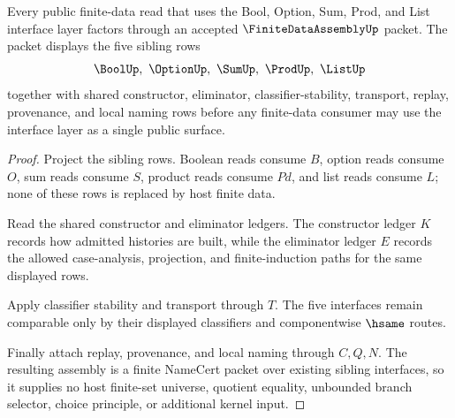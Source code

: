 \begin{theorem}
\label{thm:finite-data-assembly-seed-obligation}
Every public finite-data read that uses the Bool, Option, Sum, Prod, and List interface layer factors through an accepted $\FiniteDataAssemblyUp$ packet. The packet displays the five sibling rows
$$
\BoolUp,\ \OptionUp,\ \SumUp,\ \ProdUp,\ \ListUp
$$
together with shared constructor, eliminator, classifier-stability, transport, replay, provenance, and local naming rows before any finite-data consumer may use the interface layer as a single public surface.
\end{theorem}
\begin{proof}
Project the sibling rows. Boolean reads consume $B$, option reads consume $O$, sum reads consume $S$, product reads consume $Pd$, and list reads consume $L$; none of these rows is replaced by host finite data.

Read the shared constructor and eliminator ledgers. The constructor ledger $K$ records how admitted histories are built, while the eliminator ledger $E$ records the allowed case-analysis, projection, and finite-induction paths for the same displayed rows.

Apply classifier stability and transport through $T$. The five interfaces remain comparable only by their displayed classifiers and componentwise $\hsame$ routes.

Finally attach replay, provenance, and local naming through $C,Q,N$. The resulting assembly is a finite NameCert packet over existing sibling interfaces, so it supplies no host finite-set universe, quotient equality, unbounded branch selector, choice principle, or additional kernel input.
\end{proof}




